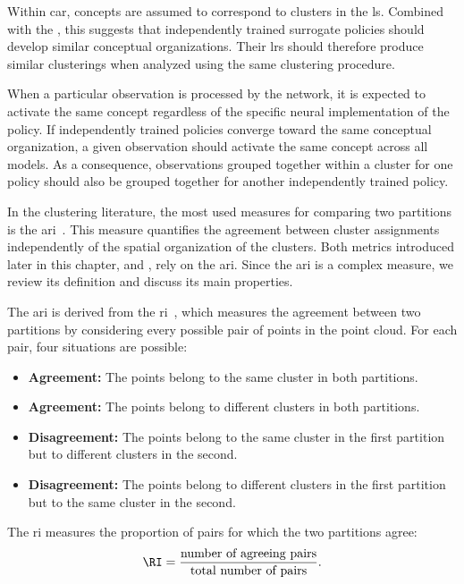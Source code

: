 Within \gls{car}, concepts are assumed to correspond to clusters in the \gls{ls}.
Combined with the \RepresentationConvergenceHypothesisName, this suggests that independently trained surrogate policies should develop similar conceptual organizations.
Their \glspl{lr} should therefore produce similar clusterings when analyzed using the same clustering procedure.

When a particular observation is processed by the network, it is expected to activate the same concept regardless of the specific neural implementation of the policy.
If independently trained policies converge toward the same conceptual organization, a given observation should activate the same concept across all models.
As a consequence, observations grouped together within a cluster for one policy should also be grouped together for another independently trained policy.

In the clustering literature, the most used measures for comparing two partitions is the \gls{ari}~\parencite{hubert1985comparing}.
This measure quantifies the agreement between cluster assignments independently of the spatial organization of the clusters.
Both metrics introduced later in this chapter, \ClusteringUniversalityName{} and \AbstractionScoreName{}, rely on the \gls{ari}.
Since the \gls{ari} is a complex measure, we review its definition and discuss its main properties.

The \gls{ari} is derived from the \gls{ri}~\parencite{rand1971objective}, which measures the agreement between two partitions by considering every possible pair of points in the point cloud.
For each pair, four situations are possible:
\begin{itemize}
\item \textbf{Agreement:} The points belong to the same cluster in both partitions.
\item \textbf{Agreement:} The points belong to different clusters in both partitions.
\item \textbf{Disagreement:} The points belong to the same cluster in the first partition but to different clusters in the second.
\item \textbf{Disagreement:} The points belong to different clusters in the first partition but to the same cluster in the second.
\end{itemize}

The \gls{ri} measures the proportion of pairs for which the two partitions agree:
$$
\RI = \frac{\text{number of agreeing pairs}}{\text{total number of pairs}}.
$$

